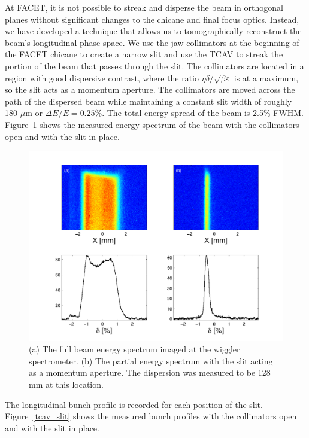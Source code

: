 \documentclass[%
twocolumn,
showpacs,preprintnumbers,
 aps,
prstab,
]{revtex4-1}
\begin{document}
At FACET, it is not possible to streak and disperse the beam in orthogonal planes without significant changes to the chicane and final focus optics. Instead, we have developed a technique that allows us to tomographically reconstruct the beam's longitudinal phase space.  We use the jaw collimators at the beginning of the FACET chicane to create a narrow slit and use the TCAV to streak the portion of the beam that passes through the slit. The collimators are located in a region with good dispersive contrast, where the ratio $\eta \delta / \sqrt{\beta \varepsilon}$ is at a maximum, so the slit acts as a momentum aperture. The collimators are moved across the path of the dispersed beam while maintaining a constant slit width of roughly 180 $\mu$m or $\Delta E/E = 0.25\%$. The total energy spread of the beam is 2.5\% FWHM. Figure~\ref{slit} shows the measured energy spectrum of the beam with the collimators open and with the slit in place.

\begin{figure}[hbt]
  \includegraphics[width=\columnwidth]{figures/slit_wlabel.pdf}
  \caption{(a) The full beam energy spectrum imaged at the wiggler spectrometer. (b) The partial energy spectrum with the slit acting as a momentum aperture. The dispersion was measured to be 128 mm at this location.}
  \label{slit}
\end{figure}

The longitudinal bunch profile is recorded for each position of the slit. Figure~\ref{tcav_slit} shows the measured bunch profiles with the collimators open and with the slit in place.
\end{document}
